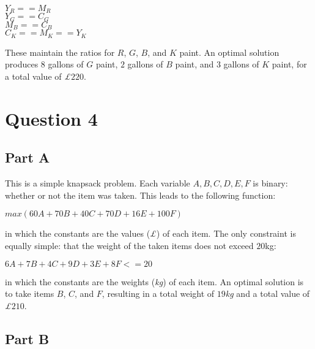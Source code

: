 \documentclass[11pt]{article} %
\begin{document}
\begin{center}

$Y_R == M_R$ \\
$Y_G == C_G$ \\
$M_B == C_B$ \\
$C_K == M_K == Y_K$ \\

\end{center}

These maintain the ratios for $R$, $G$, $B$, and $K$ paint. An optimal solution produces $8$ gallons of $G$ paint, $2$ gallons of $B$ paint, and $3$ gallons of $K$ paint, for a total value of \textit{£}$220$.

\clearpage

\section*{Question 4}

\subsection*{Part A} 

This is a simple knapsack problem. Each variable $A, B, C, D, E, F$ is binary: whether or not the item was taken. This leads to the following function:

\begin{center}

$max (60A + 70B + 40C + 70D + 16E + 100F)$

\end{center}

in which the constants are the values (\textit{£}) of each item. The only constraint is equally simple: that the weight of the taken items does not exceed $20$kg:

\begin{center}

$6A + 7B + 4C + 9D + 3E + 8F <= 20$

\end{center}

in which the constants are the weights (\textit{kg}) of each item. An optimal solution is to take items $B$, $C$, and $F$, resulting in a total weight of $19$\textit{kg} and a total value of \textit{£}$210$.

\subsection*{Part B}
\end{document}
